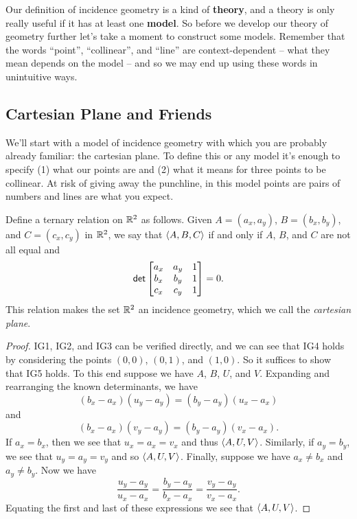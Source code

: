 Our definition of incidence geometry is a kind of \textbf{theory}, and a theory is only really useful if it has at least one \textbf{model}.
So before we develop our theory of geometry further let's take a moment to construct some models.
Remember that the words ``point'', ``collinear'', and ``line'' are context-dependent -- what they mean depends on the model -- and so we may end up using these words in unintuitive ways.


\subsection{Cartesian Plane and Friends}

We'll start with a model of incidence geometry with which you are probably already familiar: the cartesian plane.
To define this or any model it's enough to specify (1) what our points are and (2) what it means for three points to be collinear.
At risk of giving away the punchline, in this model points are pairs of numbers and lines are what you expect.

\begin{prop} \label{prop:rr2-incidence-geo}
Define a ternary relation on \(\mathbb{R}^2\) as follows.
Given \(A = (a_x, a_y)\), \(B = (b_x, b_y)\), and \(C = (c_x, c_y)\) in \(\mathbb{R}^2\), we say that \(\langle A, B, C \rangle\) if and only if \(A\), \(B\), and \(C\) are not all equal and \[ \mathsf{det} \begin{bmatrix} a_x & a_y & 1 \\ b_x & b_y & 1 \\ c_x & c_y & 1 \end{bmatrix} = 0. \]
This relation makes the set \(\mathbb{R}^2\) an incidence geometry, which we call the \emph{cartesian plane}.
\end{prop}

\begin{proof}
IG1, IG2, and IG3 can be verified directly, and we can see that IG4 holds by considering the points \((0,0)\), \((0,1)\), and \((1,0)\).
So it suffices to show that IG5 holds.
To this end suppose we have \(A\), \(B\), \(U\), and \(V\).
Expanding and rearranging the known determinants, we have \[ (b_x - a_x)(u_y - a_y) = (b_y - a_y)(u_x - a_x) \] and \[ (b_x - a_x)(v_y - a_y) = (b_y - a_y)(v_x - a_x). \]
If \(a_x = b_x\), then we see that \(u_x = a_x = v_x\) and thus \(\langle A, U, V \rangle\).
Similarly, if \(a_y = b_y\), we see that \(u_y = a_y = v_y\) and so \(\langle A, U, V \rangle\).
Finally, suppose we have \(a_x \neq b_x\) and \(a_y \neq b_y\).
Now we have \[ \frac{u_y - a_y}{u_x - a_x} = \frac{b_y - a_y}{b_x - a_x} = \frac{v_y - a_y}{v_x - a_x}. \]
Equating the first and last of these expressions we see that \(\langle A, U, V \rangle\).
\end{proof}

